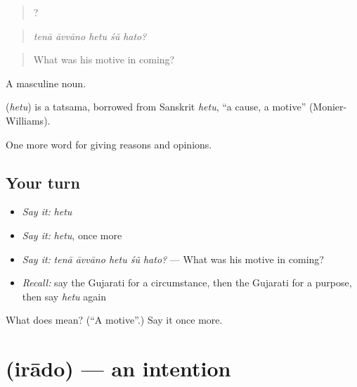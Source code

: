 \begin{quote}
    ?
\end{quote}

\begin{quote}
\emph{tenā āvvāno hetu śũ hato?}
\end{quote}

\begin{quote}
What was his motive in coming?
\end{quote}

A masculine noun.

\begin{cousinweb}
\textbf{} (\emph{hetu}) is a tatsama, borrowed from Sanskrit \emph{hetu}, \textquotedblleft{}a cause, a motive\textquotedblright{} (Monier-Williams).
\end{cousinweb}

\begin{grammarlens}[title={What you've built}]
One more word for giving reasons and opinions.
\end{grammarlens}

\subsection*{Your turn}
\begin{itemize}
\raggedright
  \item \emph{Say it:} \emph{hetu}
  \item \emph{Say it:} \emph{hetu}, once more
  \item \emph{Say it:} \emph{tenā āvvāno hetu śũ hato?} — What was his motive in coming?
  \item \emph{Recall:} say the Gujarati for a circumstance, then the Gujarati for a purpose, then say \emph{hetu} again
\end{itemize}

\begin{tcolorbox}[breakable,colback=teal!4,colframe=teal!35!black,title={Before you move on}]
What does  mean? (\textquotedblleft{}A motive\textquotedblright{}.) Say it once more.
\end{tcolorbox}
\section[\texorpdfstring{\gu{ઇરાદો} (irādo)}{ઇરાદો (irādo)}]{ (irādo) — an intention}

\label{lesson:GU-C340-irado}



